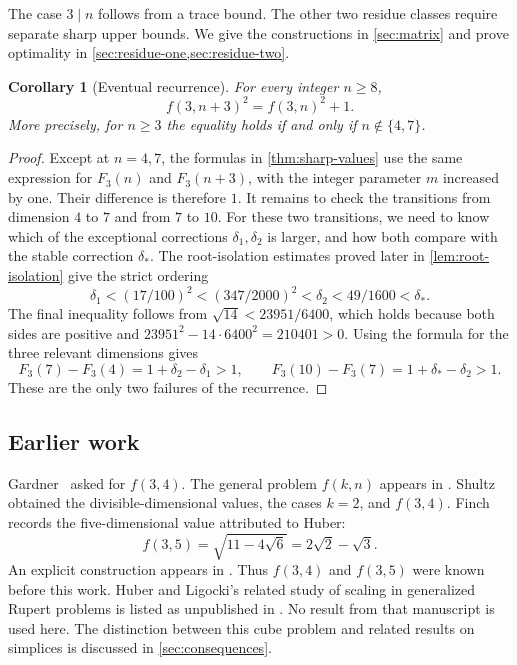 \documentclass[11pt]{article}
\numberwithin{equation}{section}
\newtheorem{corollary}[corollary]{Corollary}
\theoremstyle{definition}
\theoremstyle{definition}
\newcommand{\F}{F_3}
\newcommand{\ds}{\delta_*}
\begin{document}
The case $3\mid n$ follows from a trace bound. The other two
residue classes require separate sharp upper bounds.  We give the constructions
in \cref{sec:matrix} and prove optimality in
\cref{sec:residue-one,sec:residue-two}.

\begin{corollary}[Eventual recurrence]\label{cor:eventual-recurrence}
For every integer $n\ge8$,
\begin{equation}\label{eq:recurrence}
 f(3,n+3)^2=f(3,n)^2+1.
\end{equation}
More precisely, for $n\ge3$ the equality holds if and only if
$n\notin\{4,7\}$.
\end{corollary}
\begin{proof}
Except at $n=4,7$, the formulas in \cref{thm:sharp-values}
use the same expression for $\F(n)$ and $\F(n+3)$, with the integer
parameter $m$ increased by one. Their difference is therefore $1$.
It remains to check the transitions from dimension $4$ to $7$
and from $7$ to $10$. For these two transitions, we need to know
which of the exceptional corrections $\delta_1,\delta_2$ is larger,
and how both compare with the stable correction $\ds$.
The root-isolation estimates proved later in \cref{lem:root-isolation}
give the strict ordering
\[
 \delta_1<(17/100)^2<(347/2000)^2<\delta_2
 <49/1600<\ds.
\]
The final inequality follows from
$\sqrt{14}<23951/6400$, which holds because both sides are positive
and $23951^2-14\cdot6400^2=210401>0$.
Using the formula for the three relevant dimensions gives
\[
 \F(7)-\F(4)=1+\delta_2-\delta_1>1,\qquad
 \F(10)-\F(7)=1+\ds-\delta_2>1.
\]
These are the only two failures of the recurrence.
\end{proof}

\subsection{Earlier work}
Gardner~\cite{Gardner1966} asked for $f(3,4)$.  The general problem
$f(k,n)$ appears in \cite[Problem~B4]{CFG1991}.  Shultz
\cite{Shultz2013} obtained the divisible-dimensional values, the cases
$k=2$, and $f(3,4)$.  Finch~\cite[Sec.~8.14]{Finch2003} records the
five-dimensional value attributed to Huber:
\[
 f(3,5)=\sqrt{11-4\sqrt6}=2\sqrt2-\sqrt3.
\]
An explicit construction appears in \cite{Firsching2014}.
Thus $f(3,4)$ and $f(3,5)$ were known before this work.
Huber and Ligocki's related study of scaling in generalized Rupert
problems is listed as unpublished in \cite{HSW2018}.
No result from that manuscript is used here.
The distinction between this cube problem and related results on
simplices is discussed in \cref{sec:consequences}.
\end{document}

